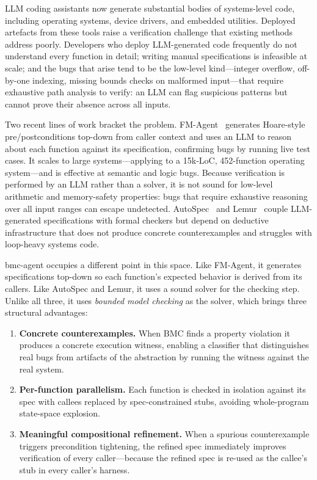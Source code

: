 \documentclass[11pt,a4paper]{article}
\newcommand{\tool}{bmc-agent\xspace}
\newcommand{\fmagent}{FM-Agent\xspace}
\begin{document}
LLM coding assistants now generate substantial bodies of systems-level code,
including operating systems, device drivers, and embedded utilities. Deployed
artefacts from these tools raise a verification challenge that existing methods
address poorly. Developers who deploy LLM-generated code frequently do not
understand every function in detail; writing manual specifications is infeasible
at scale; and the bugs that arise tend to be the low-level kind---integer
overflow, off-by-one indexing, missing bounds checks on malformed input---that
require exhaustive path analysis to verify: an LLM can flag suspicious
patterns but cannot prove their absence across all inputs.

Two recent lines of work bracket the problem.
\fmagent~\cite{fmagent} generates Hoare-style pre/postconditions top-down
from caller context and uses an LLM to reason about each function against
its specification, confirming bugs by running live test cases. It scales
to large systems---applying to a 15k-LoC, 452-function operating
system---and is effective at semantic and logic bugs. Because verification
is performed by an LLM rather than a solver, it is not sound for low-level
arithmetic and memory-safety properties: bugs that require exhaustive
reasoning over all input ranges can escape undetected.
AutoSpec~\cite{autospec} and Lemur~\cite{lemur} couple LLM-generated
specifications with formal checkers but depend on deductive infrastructure
that does not produce concrete counterexamples and struggles with
loop-heavy systems code.

\tool occupies a different point in this space. Like \fmagent, it generates
specifications top-down so each function's expected behavior is derived from
its callers. Like AutoSpec and Lemur, it uses a sound solver for the checking
step. Unlike all three, it uses \emph{bounded model checking} as the solver,
which brings three structural advantages:

\begin{enumerate}
\item \textbf{Concrete counterexamples.} When BMC finds a property violation it
  produces a concrete execution witness, enabling a classifier that
  distinguishes real bugs from artifacts of the abstraction by running the
  witness against the real system.

\item \textbf{Per-function parallelism.} Each function is checked in isolation
  against its spec with callees replaced by spec-constrained stubs, avoiding
  whole-program state-space explosion.

\item \textbf{Meaningful compositional refinement.} When a spurious
  counterexample triggers precondition tightening, the refined spec immediately
  improves verification of every caller---because the refined spec is re-used
  as the callee's stub in every caller's harness.
\end{enumerate}
\end{document}
